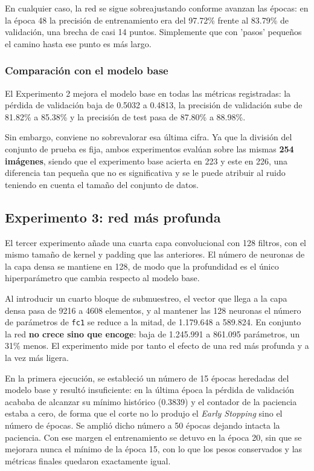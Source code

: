 \documentclass[11pt, a4paper]{article}
\begin{document}
En cualquier caso, la red se sigue sobreajustando conforme avanzan las épocas: en la época 48 la precisión de entrenamiento era del 97.72\% frente al 83.79\% de validación, una brecha de casi 14 puntos. Simplemente que con 'pasos' pequeños el camino hasta ese punto es más largo.

\subsubsection{Comparación con el modelo base}
El Experimento 2 mejora el modelo base en todas las métricas registradas: la pérdida de validación baja de 0.5032 a 0.4813, la precisión de validación sube de 81.82\% a 85.38\% y la precisión de test pasa de 87.80\% a 88.98\%.

Sin embargo, conviene no sobrevalorar esa última cifra. Ya que la división del conjunto de prueba es fija, ambos experimentos evalúan sobre las mismas \textbf{254 imágenes}, siendo que el experimento base acierta en 223 y este en 226, una diferencia tan pequeña que no es significativa y se le puede atribuir al ruido teniendo en cuenta el tamaño del conjunto de datos.

\subsection{Experimento 3: red más profunda}

El tercer experimento añade una cuarta capa convolucional con 128 filtros, con el mismo tamaño de kernel y padding que las anteriores. El número de neuronas de la capa densa se mantiene en 128, de modo que la profundidad es el único hiperparámetro que cambia respecto al modelo base.

Al introducir un cuarto bloque de submuestreo, el vector que llega a la capa densa pasa de 9216 a 4608 elementos, y al mantener las 128 neuronas el número de parámetros de \texttt{fc1} se reduce a la mitad, de 1.179.648 a 589.824. En conjunto la red \textbf{no crece sino que encoge}: baja de 1.245.991 a 861.095 parámetros, un 31\% menos. El experimento mide por tanto el efecto de una red más profunda y a la vez más ligera.

En la primera ejecución, se estableció un número de 15 épocas heredadas del modelo base y resultó insuficiente: en la última época la pérdida de validación acababa de alcanzar su mínimo histórico (0.3839) y el contador de la paciencia estaba a cero, de forma que el corte no lo produjo el \textit{Early Stopping} sino el número de épocas. Se amplió dicho número a 50 épocas dejando intacta la paciencia. Con ese margen el entrenamiento se detuvo en la época 20, sin que se mejorara nunca el mínimo de la época 15, con lo que los pesos conservados y las métricas finales quedaron exactamente igual. 
\end{document}
